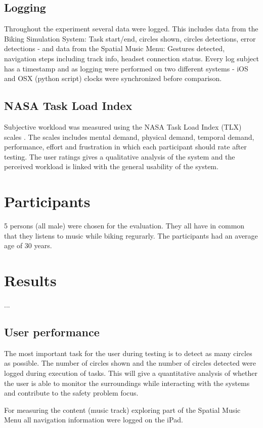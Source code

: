 \subsection{Logging}
Throughout the experiment several data were logged. This includes data from the Biking Simulation System: Task start/end, circles shown, circles detections, error detections - and data from the Spatial Music Menu: Gestures detected, navigation steps including track info, headset connection status. Every log subject has a timestamp and as logging were performed on two different systems - iOS and OSX (python script) clocks were synchronized before comparison.


\subsection{NASA Task Load Index}
Subjective workload was measured using the NASA Task Load Index (TLX) scales \cite{hart_workload_1990}. The scales includes mental demand, physical demand, temporal demand, performance, effort and frustration in which each participant should rate after testing. The user ratings gives a qualitative analysis of the system and the perceived workload is linked with the general usability of the system.


\section{Participants}
5 persons (all male) were chosen for the evaluation. They all have in common that they listens to music while biking regurarly. The participants had an average age of 30 years.


\section{Results}
...

\subsection{User performance}
The most important task for the user during testing is to detect as many circles as possible. The number of circles shown and the number of circles detected were logged during execution of tasks. This will give a quantitative analysis of whether the user is able to monitor the surroundings while interacting with the systems and contribute to the safety problem focus.

For measuring the content (music track) exploring part of the Spatial Music Menu all navigation information were logged on the iPad. 

